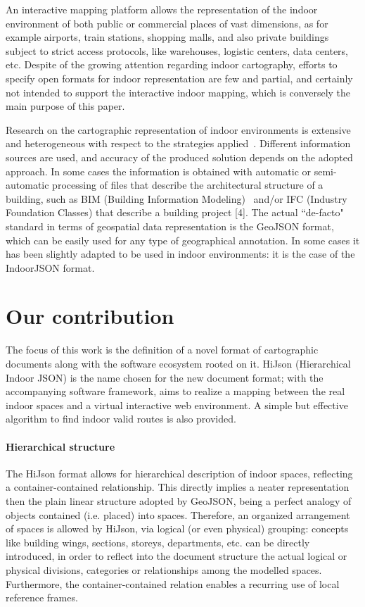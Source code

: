 \documentclass{sig-alternate}
\begin{document}
An interactive mapping platform allows the representation of the indoor environment of  both public or commercial places of vast dimensions, as for example airports, train stations, shopping malls, and also private buildings subject to strict access protocols, like warehouses, logistic centers, data centers, etc.
Despite of the growing attention regarding indoor cartography, efforts to specify open formats for indoor representation are few and partial, and certainly not intended to support the interactive indoor mapping, which is conversely the main purpose of this paper.

Research on the cartographic representation of indoor environments is extensive and heterogeneous with respect to the strategies applied~\cite{6418876}. Different information sources are used, and accuracy of the produced solution depends on the adopted approach. In some cases the information is obtained with automatic or semi-automatic processing of files that describe the architectural structure of a building, such as BIM (Building Information Modeling)~\cite{Eastman:2008:BHG:1796500} and/or IFC (Industry Foundation Classes) that describe a building project [4]. 
The actual ``de-facto" standard in terms of geospatial data representation is the GeoJSON format, which can be easily used for any type of geographical annotation. In some cases it has been slightly adapted to be used in indoor environments: it is the case of the IndoorJSON format.


\section{Our contribution}

The focus of this work is the definition of a novel format of cartographic documents along with the software ecosystem rooted on it. HiJson (Hierarchical Indoor JSON) is the name chosen for the new document format; with the accompanying software framework, aims to realize a mapping between the real indoor spaces and a virtual interactive web environment. A simple but effective algorithm to find indoor valid routes is also provided. 

\paragraph{Hierarchical structure}

The HiJson format allows for hierarchical description of indoor spaces, reflecting a container-contained relationship. This directly implies a neater representation then the plain linear structure adopted by GeoJSON, being a perfect analogy of objects contained (i.e. placed) into spaces.
Therefore, an organized arrangement of spaces is allowed by HiJson, via logical (or even physical) grouping: concepts like building wings, sections, storeys, departments, etc. can be directly introduced, in order to reflect into the document structure the actual logical or physical divisions, categories or relationships among the modelled spaces.
Furthermore, the container-contained relation enables a recurring use of local reference frames.
\end{document}
